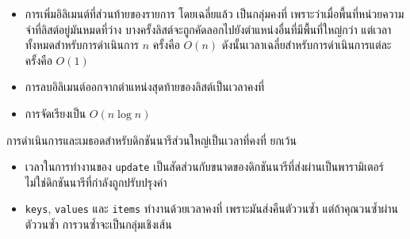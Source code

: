 \begin{itemize}


\item การเพิ่มอิลิเมนต์ที่ส่วนท้ายของรายการ โดยเฉลี่ยแล้ว เป็นกลุ่มคงที่ 
เพราะว่าเมื่อพื้นที่หน่วยความจำที่ลิสต์อยู่มันหมดที่ว่าง บางครั้งลิสต์จะถูกคัดลอกไปยังตำแหน่งอื่นที่มีพื้นที่ใหญ่กว่า 
แต่เวลาทั้งหมดสำหรับการดำเนินการ {\scriptsize$n$} ครั้งคือ {\scriptsize$O(n)$} ดังนั้นเวลาเฉลี่ยสำหรับการดำเนินการแต่ละครั้งคือ {\scriptsize$O(1)$}

\item การลบอิลิเมนต์ออกจากตำแหน่งสุดท้ายของลิสต์เป็นเวลาคงที่

\item การจัดเรียงเป็น {\scriptsize$O(n \log n)$}

\end{itemize}

การดำเนินการและเมธอดสำหรับดิกชันนารีส่วนใหญ่เป็นเวลาที่คงที่ ยกเว้น

\begin{itemize}

  
\item เวลาในการทำงานของ {\tt update} เป็นสัดส่วนกับขนาดของดิกชันนารีที่ส่งผ่านเป็นพารามิเตอร์ 
ไม่ใช่ดิกชันนารีที่กำลังถูกปรับปรุงค่า

  
\item {\tt keys}, {\tt values} และ {\tt items} ทำงานด้วยเวลาคงที่
เพราะมันส่งคืนตัววนซ้ำ แต่ถ้าคุณวนซ้ำผ่านตัววนซ้ำ การวนซ้ำจะเป็นกลุ่มเชิงเส้น


\end{itemize}

